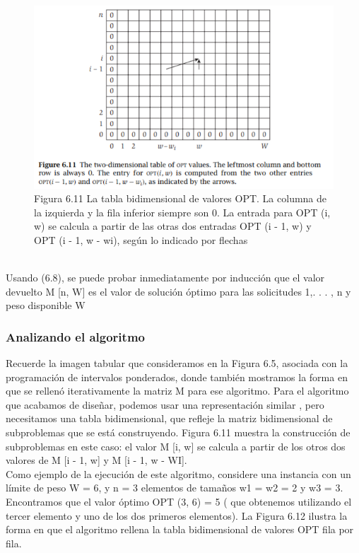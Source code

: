 \documentclass[a4paper]{article}
\begin{document}
\begin{figure}[h]
\centering
\includegraphics[scale=1]{Imagenes-Seccion6/fig6_11.PNG}
\caption{Figura 6.11 La tabla bidimensional de valores OPT. La columna de la izquierda y la fila inferior siempre son 0. La entrada para OPT (i, w) se calcula a partir de las otras dos entradas OPT (i - 1, w) y OPT (i - 1, w - wi), según lo indicado por flechas}
\end{figure}\\

Usando (6.8), se puede probar inmediatamente por inducción que el valor devuelto M [n, W] es el valor de solución óptimo para las solicitudes 1,. . . , n y peso disponible W\\

\subsubsection*{Analizando el algoritmo}

Recuerde la imagen tabular que consideramos en la Figura 6.5, asociada con la programación de intervalos ponderados, donde también mostramos la forma en que se rellenó iterativamente la matriz M para ese algoritmo. Para el algoritmo que acabamos de diseñar, podemos usar una representación similar , pero necesitamos una tabla bidimensional, que refleje la matriz bidimensional de subproblemas que se está construyendo. Figura 6.11 muestra la construcción de subproblemas en este caso: el valor M [i, w] se calcula a partir de los otros dos valores de M [i - 1, w] y M [i - 1, w - WI].\\

Como ejemplo de la ejecución de este algoritmo, considere una instancia con un límite de peso W = 6, y n = 3 elementos de tamaños w1 = w2 = 2 y w3 = 3. Encontramos que el valor óptimo OPT (3, 6) = 5 ( que obtenemos utilizando el tercer elemento y uno de los dos primeros elementos). La Figura 6.12 ilustra la forma en que el algoritmo rellena la tabla bidimensional de valores OPT fila por fila.\\
\end{document}
